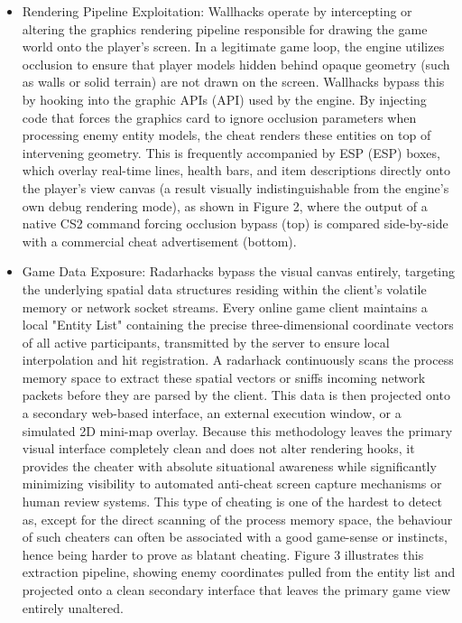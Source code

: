 \begin{itemize}
    \item Rendering Pipeline Exploitation: Wallhacks operate by intercepting or altering the graphics rendering pipeline responsible for drawing the game world onto the player's screen. In a legitimate game loop, the engine utilizes occlusion to ensure that player models hidden behind opaque geometry (such as walls or solid terrain) are not drawn on the screen. Wallhacks bypass this by hooking into the graphic \gls{API}s (API) used by the engine. By injecting code that forces the graphics card to ignore occlusion parameters when processing enemy entity models, the cheat renders these entities on top of intervening geometry. This is frequently accompanied by \gls{ESP} (ESP) boxes, which overlay real-time lines, health bars, and item descriptions directly onto the player's view canvas (a result visually indistinguishable from the engine's own debug rendering mode), as shown in Figure 2, where the output of a native CS2 command forcing occlusion bypass (top) is compared side-by-side with a commercial cheat advertisement (bottom).
    \item Game Data Exposure: Radarhacks bypass the visual canvas entirely, targeting the underlying spatial data structures residing within the client’s volatile memory or network socket streams. Every online game client maintains a local "Entity List" containing the precise three-dimensional coordinate vectors of all active participants, transmitted by the server to ensure local interpolation and hit registration. A radarhack continuously scans the process memory space to extract these spatial vectors or sniffs incoming network packets before they are parsed by the client. This data is then projected onto a secondary web-based interface, an external execution window, or a simulated 2D mini-map overlay. Because this methodology leaves the primary visual interface completely clean and does not alter rendering hooks, it provides the cheater with absolute situational awareness while significantly minimizing visibility to automated anti-cheat screen capture mechanisms or human review systems. This type of cheating is one of the hardest to detect as, except for the direct scanning of the process memory space, the behaviour of such cheaters can often be associated with a good game-sense or instincts, hence being harder to prove as blatant cheating. Figure 3 illustrates this extraction pipeline, showing enemy coordinates pulled from the entity list and projected onto a clean secondary interface that leaves the primary game view entirely unaltered.
\end{itemize}

